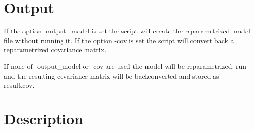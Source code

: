 \section{Output}

If the option -output\_model is set the script will create the reparametrized model file without running it.
If the option -cov is set the script will convert back a reparametrized covariance matrix.

If none of -output\_model or -cov are used the model will be reparametrized, run and the resulting covariance matrix will be
backconverted and stored as result.cov.


\section{Description}






